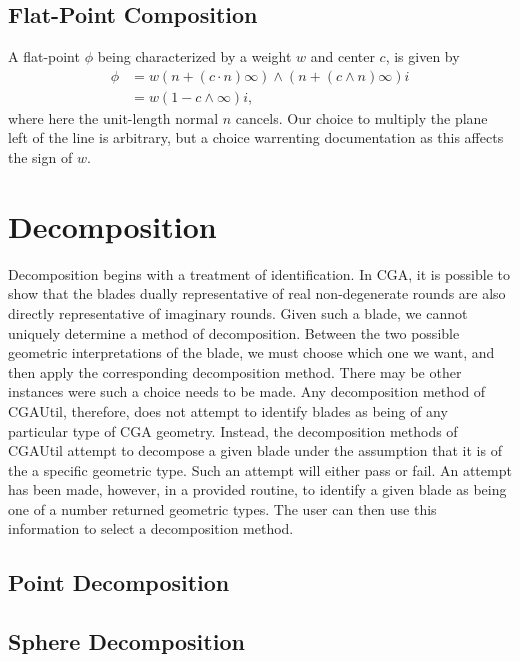 \documentclass[12pt]{article}
\newcommand{\nvai}{\infty}
\begin{document}
\subsection{Flat-Point Composition}

A flat-point $\phi$ being characterized by a weight $w$ and center $c$, is given
by
\begin{align}\label{equ_flatpoint}
\phi &= w(n+(c\cdot n)\nvai)\wedge(n+(c\wedge n)\nvai)i \\
 &= w(1-c\wedge\nvai)i,
\end{align}
where here the unit-length normal $n$ cancels.  Our choice to multiply the plane
left of the line is arbitrary, but a choice warrenting documentation as this affects the sign of $w$.

\section{Decomposition}

Decomposition begins with a treatment of identification.  In CGA, it is possible
to show that the blades dually representative of real non-degenerate rounds are also
directly representative of imaginary rounds.  Given such a blade, we cannot
uniquely determine a method of decomposition.  Between the two possible
geometric interpretations of the blade, we must choose which one we want,
and then apply the corresponding decomposition method.
There may be other instances were such a
choice needs to be made.  Any decomposition method of CGAUtil, therefore, does not attempt to identify
blades as being of any particular type of CGA geometry.  Instead, the decomposition
methods of CGAUtil attempt to decompose a given blade under the assumption
that it is of the a specific geometric type.  Such an attempt will either pass or fail.
An attempt has been made, however, in a provided routine, to identify
a given blade as being one of a number returned geometric types.  The user
can then use this information to select a decomposition method.


\subsection{Point Decomposition}

\subsection{Sphere Decomposition}
\end{document}
